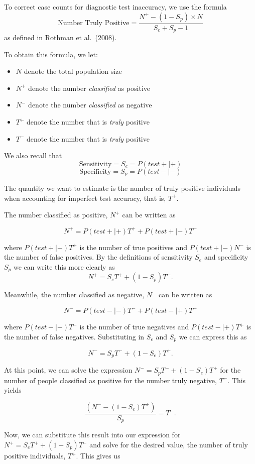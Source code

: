 \documentclass[12pt,twoside]{smiththesis}
\providecommand{\tightlist}{%
  \setlength{\itemsep}{0pt}\setlength{\parskip}{0pt}}
\begin{document}
To correct case counts for diagnostic test inaccuracy, we use the formula
\[\text{Number Truly Positive} = \dfrac{N^+ - (1-S_p) \times N}{S_e+S_p-1}\]
as defined in Rothman et al.~(2008).

To obtain this formula, we let:
\begin{itemize}
\tightlist
\item
  \(N\) denote the total population size
\item
  \(N^+\) denote the number \emph{classified} as positive
\item
  \(N^-\) denote the number \emph{classified} as negative
\item
  \(T^+\) denote the number that is \emph{truly} positive
\item
  \(T^-\) denote the number that is \emph{truly} positive
\end{itemize}
We also recall that
\[ \text{Sensitivity} = S_e = P(test + | +) \]
\[ \text{Specificity} = S_p = P(test - | - ) \]

The quantity we want to estimate is the number of truly positive individuals when accounting for imperfect test accuracy, that is, \(T^+\).

The number classified as positive, \(N^+\) can be written as

\[ N^+ = P(test + | +) T^+ + P(test + | -) T^-\]

where \(P(test + | +) T^+\) is the number of true positives and \(P(test + | -) N^-\) is the number of false positives. By the definitions of sensitivity \(S_e\) and specificity \(S_p\) we can write this more clearly as
\[ N^+ =S_e T^+ + (1-S_p) T^-.\]

Meanwhile, the number classified as negative, \(N^-\) can be written as

\[ N^- = P(test - | -) T^- + P(test - | +) T^+\]

where \(P(test - | -) T^-\) is the number of true negatives and \(P(test - | +) T^+\) is the number of false negatives. Substituting in \(S_e\) and \(S_p\) we can express this as

\[ N^- = S_p T^- + (1-S_e) T^+.\]

At this point, we can solve the expression \(N^- = S_p T^- + (1-S_e) T^+\) for the number of people classified as positive for the number truly negative, \(T^-\). This yields

\[\dfrac{( N^- - (1-S_e) T^+) }{S_p}=  T^- .\]

Now, we can substitute this result into our expression for \(N^+ =S_e T^+ + (1-S_p) T^-\) and solve for the desired value, the number of truly positive individuals, \(T^+\). This gives us
\end{document}
